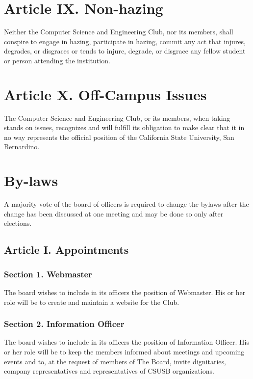 \documentclass{article}
\begin{document}
\section{Article IX. Non-hazing}
  Neither the Computer Science and Engineering Club, nor its members, shall conspire to engage in hazing, participate in hazing, commit any act that injures, degrades, or disgraces or tends to injure, degrade, or disgrace any fellow student or person attending the institution.

\section{Article X. Off-Campus Issues}
  The Computer Science and Engineering Club, or its members, when taking stands on issues, recognizes and will fulfill its obligation to make clear that it in no way represents the official position of the California State University, San Bernardino.

\newpage
\section{By-laws}
  A majority vote of the board of officers is required to change the bylaws after the change has been discussed at one meeting and may be done so only after elections.

  \subsection{Article I. Appointments}

    \subsubsection{Section 1. Webmaster}
      The board wishes to include in its officers the position of Webmaster. His or her role will be to create and maintain a website for the Club.

    \subsubsection{Section 2. Information Officer}
      The board wishes to include in its officers the position of Information Officer. His or her role will be to keep the members informed about meetings and upcoming events and to, at the request of members of The Board, invite dignitaries, company representatives and representatives of CSUSB organizations.
\end{document}

